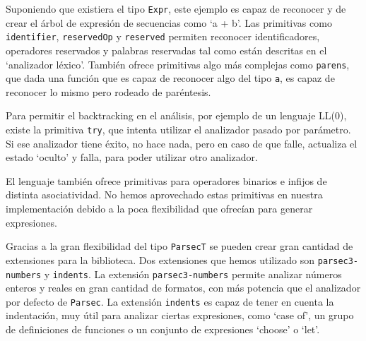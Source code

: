 \documentclass[class=article, crop=false]{standalone}
\begin{document}
Suponiendo que existiera el tipo \verb`Expr`, este ejemplo es capaz de reconocer y de crear
el árbol de expresión de secuencias como `a + b'. Las primitivas como \verb`identifier`,
\verb`reservedOp` y \verb`reserved` permiten reconocer identificadores, operadores reservados
y palabras reservadas tal como están descritas en el `analizador léxico'. También ofrece
primitivas algo más complejas como \verb`parens`, que dada una función que es capaz de
reconocer algo del tipo \verb`a`, es capaz de reconocer lo mismo pero rodeado de paréntesis.

Para permitir el backtracking en el análisis, por ejemplo de un lenguaje LL(0), existe la
primitiva \verb`try`, que intenta utilizar el analizador pasado por parámetro. Si ese
analizador tiene éxito, no hace nada, pero en caso de que falle, actualiza el estado `oculto'
y falla, para poder utilizar otro analizador.

El lenguaje también ofrece primitivas para operadores binarios e infijos de distinta
asociatividad. No hemos aprovechado estas primitivas en nuestra implementación debido a la
poca flexibilidad que ofrecían para generar expresiones.

Gracias a la gran flexibilidad del tipo \verb`ParsecT` se pueden crear gran cantidad de
extensiones para la biblioteca. Dos extensiones que hemos utilizado son \verb`parsec3-numbers`
y \verb`indents`. La extensión \verb`parsec3-numbers` permite analizar números enteros y
reales en gran cantidad de formatos, con más potencia que el analizador por defecto de
\verb`Parsec`. La extensión \verb`indents` es capaz de tener en cuenta la indentación, muy
útil para analizar ciertas expresiones, como `case of', un grupo de definiciones de funciones
o un conjunto de expresiones `choose' o `let'.
\end{document}
